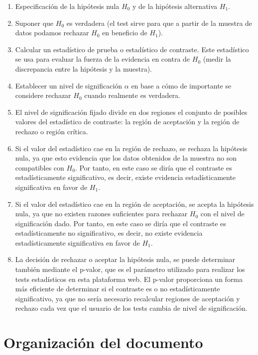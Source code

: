 \begin{enumerate}
\item Especificación de la hipótesis nula $H_0$ y de la hipótesis alternativa $H_1$.
\item Suponer que $H_0$ es verdadera (el test sirve para que a partir de la muestra de datos podamos rechazar
$H_0$ en beneficio de $H_1$).
\item Calcular un estadístico de prueba o estadístico de contraste. Este estadístico se usa para evaluar la
fuerza de la evidencia en contra de $H_0$ (medir la discrepancia entre la hipótesis y la muestra).
\item Establecer un nivel de significación $\alpha$ en base a cómo de importante se considere rechazar $H_0$
cuando realmente es verdadera.
\item El nivel de significación fijado divide en dos regiones el conjunto de posibles valores del estadístico
de contraste: la región de aceptación y la región de rechazo o región crítica.
\item Si el valor del estadístico cae en la región de rechazo, se rechaza la hipótesis nula, ya que esto
evidencia que los datos obtenidos de la muestra no son compatibles con $H_0$. Por tanto, en este caso se diría
que el contraste es estadísticamente significativo, es decir, existe evidencia estadísticamente significativa en
favor de $H_1$.
\item Si el valor del estadístico cae en la región de aceptación, se acepta la hipótesis nula, ya que no existen
razones suficientes para rechazar $H_0$ con el nivel de significación dado. Por tanto, en este caso se diría
que el contraste es estadísticamente no significativo, es decir, no existe evidencia estadísticamente significativa
en favor de $H_1$.
\item La decisión de rechazar o aceptar la hipótesis nula, se puede determinar también mediante el p-valor,
que es el parámetro utilizado para realizar los tests estadísticos en esta plataforma web. El p-valor proporciona
un forma más eficiente de determinar si el contraste es o no estadísticamente significativo, ya que no sería
necesario recalcular regiones de aceptación y rechazo cada vez que el usuario de los tests cambia de nivel de
significación.
\end{enumerate}


\section{Organización del documento}
